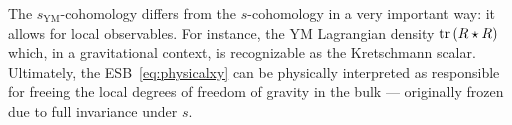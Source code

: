 \documentclass[../main.tex]{subfiles}
\begin{document}
The $ s_{\text{YM}} $-cohomology differs from the $ s $-cohomology in a very important way: it allows for local observables. For instance, the YM Lagrangian density $ \operatorname{tr} \left( R \star R \right) $ which, in a gravitational context, is recognizable as the Kretschmann scalar. Ultimately, the ESB~\eqref{eq:physicalxy} can be physically interpreted as responsible for freeing the local degrees of freedom of gravity in the bulk --- originally frozen due to full invariance under $s$.
\end{document}
